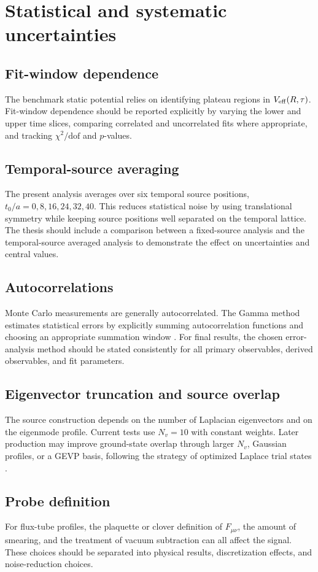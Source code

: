 \chapter{Statistical and systematic uncertainties}
\label{chap:systematics}

\section{Fit-window dependence}
The benchmark static potential relies on identifying plateau regions in \(V_{\mathrm{eff}}(R,\tau)\). Fit-window dependence should be reported explicitly by varying the lower and upper time slices, comparing correlated and uncorrelated fits where appropriate, and tracking \(\chi^2/\mathrm{dof}\) and \(p\)-values.

\section{Temporal-source averaging}
The present analysis averages over six temporal source positions, \(t_0/a=0,8,16,24,32,40\). This reduces statistical noise by using translational symmetry while keeping source positions well separated on the temporal lattice. The thesis should include a comparison between a fixed-source analysis and the temporal-source averaged analysis to demonstrate the effect on uncertainties and central values.

\section{Autocorrelations}
Monte Carlo measurements are generally autocorrelated. The Gamma method estimates statistical errors by explicitly summing autocorrelation functions and choosing an appropriate summation window \cite{Wolff2004}. For final results, the chosen error-analysis method should be stated consistently for all primary observables, derived observables, and fit parameters.

\section{Eigenvector truncation and source overlap}
The source construction depends on the number of Laplacian eigenvectors and on the eigenmode profile. Current tests use \(N_v=10\) with constant weights. Later production may improve ground-state overlap through larger \(N_v\), Gaussian profiles, or a GEVP basis, following the strategy of optimized Laplace trial states \cite{Hoellwieser2023}.

\section{Probe definition}
For flux-tube profiles, the plaquette or clover definition of \(F_{\mu\nu}\), the amount of smearing, and the treatment of vacuum subtraction can all affect the signal. These choices should be separated into physical results, discretization effects, and noise-reduction choices.
